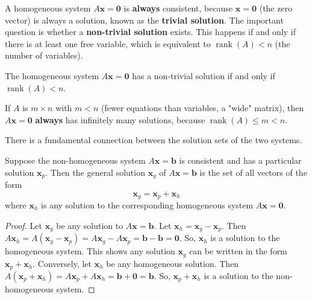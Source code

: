 A homogeneous system $A\mathbf{x} = \mathbf{0}$ is \textbf{always} consistent, because $\mathbf{x} = \mathbf{0}$ (the zero vector) is always a solution, known as the \textbf{trivial solution}.
The important question is whether a \textbf{non-trivial solution} exists.
This happens if and only if there is at least one free variable, which is equivalent to $\operatorname{rank}(A) < n$ (the number of variables).

\begin{theorem}
The homogeneous system $A\mathbf{x} = \mathbf{0}$ has a non-trivial solution if and only if $\operatorname{rank}(A) < n$.
\end{theorem}
\begin{corollary}
If $A$ is $m \times n$ with $m < n$ (fewer equations than variables, a "wide" matrix), then $A\mathbf{x} = \mathbf{0}$ \textbf{always} has infinitely many solutions, because $\operatorname{rank}(A) \le m < n$.
\end{corollary}

There is a fundamental connection between the solution sets of the two systems.

\begin{theorem}
Suppose the non-homogeneous system $A\mathbf{x} = \mathbf{b}$ is consistent and has a particular solution $\mathbf{x}_p$. Then the general solution $\mathbf{x}_g$ of $A\mathbf{x} = \mathbf{b}$ is the set of all vectors of the form
\[ \mathbf{x}_g = \mathbf{x}_p + \mathbf{x}_h \]
where $\mathbf{x}_h$ is any solution to the corresponding homogeneous system $A\mathbf{x} = \mathbf{0}$.
\end{theorem}
\begin{proof}
Let $\mathbf{x}_g$ be any solution to $A\mathbf{x} = \mathbf{b}$. Let $\mathbf{x}_h = \mathbf{x}_g - \mathbf{x}_p$.
Then $A\mathbf{x}_h = A(\mathbf{x}_g - \mathbf{x}_p) = A\mathbf{x}_g - A\mathbf{x}_p = \mathbf{b} - \mathbf{b} = \mathbf{0}$.
So, $\mathbf{x}_h$ is a solution to the homogeneous system.
This shows any solution $\mathbf{x}_g$ can be written in the form $\mathbf{x}_p + \mathbf{x}_h$.
Conversely, let $\mathbf{x}_h$ be any homogeneous solution.
Then $A(\mathbf{x}_p + \mathbf{x}_h) = A\mathbf{x}_p + A\mathbf{x}_h = \mathbf{b} + \mathbf{0} = \mathbf{b}$.
So, $\mathbf{x}_p + \mathbf{x}_h$ is a solution to the non-homogeneous system.
\end{proof}

